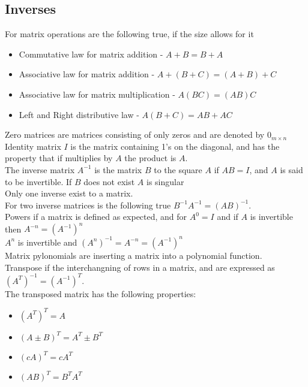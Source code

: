 \documentclass[12pt, a4paper]{article}
\begin{document}
		\subsection{Inverses}
			For matrix operations are the following true, if the size allows for it
			\begin{itemize}
				\item Commutative law for matrix addition - $A + B = B + A$
				\item Associative law for matrix addition - $A + ( B + C) = (A+B)+C$
				\item Associative law for matrix multiplication - $A(BC)=(AB)C$\\
				\item Left and Right distributive law - $A(B+C)=AB+AC$
			\end{itemize}
			Zero matrices are matrices consisting of only zeros and are denoted by $0_{m\times n}$\\
			Identity matrix $I$ is the matrix containing 1's on the diagonal, and has the property that if multiplies by $A$ the product is $A$.\\
			The inverse matrix $A^{-1}$ is the matrix $B$ to the square $A$ if $AB=I$, and $A$ is said to be invertible. If $B$ does not exist $A$ is singular\\
			Only one inverse exist to a matrix.\\
			For two inverse matrices is the following true $B^{-1}A^{-1}=(AB)^{-1}$.\\
			Powers if a matrix is defined as expected, and for $A^0=I$ and if $A$ is invertible then $A^{-n}=(A^{-1})^n$\\
			$A^n$ is invertible and $(A^n)^{-1}=A^{-n}=(A^{-1})^n$\\
			Matrix pylonomials are inserting a matrix into a polynomial function.\\
			Transpose if the interchangning of rows in a matrix, and are expressed as $(A^T)^{-1}=(A^{-1})^T$.\\
			The transposed matrix has the following properties:
			\begin{itemize}
				\item $(A^T)^T=A$
				\item $(A\pm B)^T=A^T\pm B^T$ 
				\item $(cA)^T=cA^T$
				\item $(AB)^T=B^TA^T$
			\end{itemize}
\end{document}
